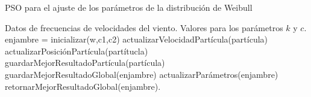 
\begin{algorithm}[h!]
\caption{PSO para el ajuste de los parámetros de la distribución de Weibull}
\label{alg:pso}
\begin{algorithmic}
\Require Datos de frecuencias de velocidades del viento.
\Ensure Valores para los parámetros $k$ y $c$.
\State enjambre = inicializar(w,c1,c2)
    \State actualizarVelocidadPartícula(partícula)
    \State actualizarPosiciónPartícula(partítucla)
    \State guardarMejorResultadoPartícula(partícula)
\EndFor
\State guardarMejorResultadoGlobal(enjambre)
\State actualizarParámetros(enjambre)
\EndFor
\State retornarMejorResultadoGlobal(enjambre).
\end{algorithmic}
\end{algorithm}
